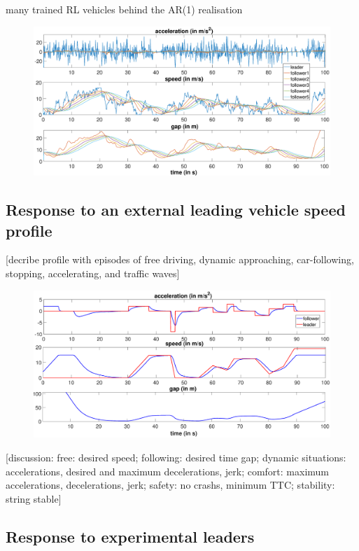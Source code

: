\documentclass[review]{elsarticle}
\begin{document}
many trained RL vehicles behind the AR(1) realisation

\begin{figure}
	\centering
	\includegraphics[width=12cm]{images/AR1Kolonne}
	\caption{}
	\label{fig:AR1Kolonne}
\end{figure}

\subsection{Response to an external leading vehicle speed profile}

[decribe profile with episodes of free driving, dynamic approaching,
  car-following, stopping, accelerating, and traffic waves]

\begin{figure}
	\centering
	\includegraphics[width=12cm]{images/manipulatedLeader}
	\caption{}
	\label{fig:manipulatedLeader}
\end{figure}

[discussion: free: desired speed; following: desired time gap; dynamic
  situations: accelerations, desired and maximum  decelerations, jerk;
comfort: maximum accelerations, decelerations, jerk;
  safety: no crashs, minimum TTC; stability: string stable]


\subsection{Response to experimental leaders}
\end{document}
